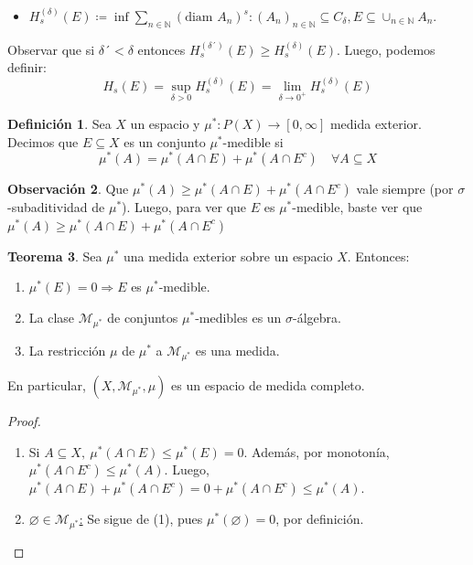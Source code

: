 \documentclass[11pt]{article}
\theoremstyle{definition} %
\newtheorem{theorem}{Teorema}[section]
\newtheorem{definition}[theorem]{Definición}
\newtheorem{remark}[theorem]{Observación}
\newcommand{\N}{\mathbb{N}}
\begin{document}
\begin{property}
\begin{itemize}
  \item $H_s^{(\delta)}(E)\coloneqq \inf{\sum_{n\in \N}(\text{diam }A_n)^s: (A_n)_{n\in \N} \subseteq C_{\delta}, E\subseteq \cup_{n\in \N}A_n}$.
\end{itemize}
Observar que si $\delta´< \delta $ entonces $H_s^{(\delta´)}(E) \geq H_s^{(\delta)}(E)$. Luego, podemos definir:
\[
  H_s(E) = \sup_{\delta > 0}H_s^{(\delta)}(E) = \lim_{\delta \to 0^+} H_s^{(\delta)}(E)
\]


\begin{definition}
  Sea $X$ un espacio y $\mu^*:P(X)\rightarrow [0,\infty]$ medida exterior. Decimos que $E\subseteq X$ es un conjunto $\mu^*$-medible si 
  \[
    \mu^*(A)= \mu^*(A\cap E)+ \mu^*(A\cap E^c) \quad \forall A\subseteq X
  \]
\end{definition}

\begin{remark}
  Que $\mu^*(A)\geq \mu^*(A\cap E)+ \mu^*(A\cap E^c) $ vale siempre (por $\sigma$-subaditividad de $\mu^*$). Luego, para ver que $E$ es $\mu^*$-medible, baste ver que $\mu^*(A)\geq \mu^*(A\cap E)+ \mu^*(A\cap E^c)$ 
\end{remark}

\begin{theorem}
  Sea $\mu^*$ una medida exterior sobre un espacio $X$. Entonces:
  \begin{enumerate}
    \item[(1)] $\mu^*(E)=0 \Rightarrow E$ es $\mu^*$-medible.

    \item[(2)] La clase $\mathscr{M}_{\mu^*}$ de conjuntos $\mu^*$-medibles es un $\sigma$-álgebra.

    \item[(3)] La restricción $\mu$ de $\mu^*$ a $\mathscr{M}_{\mu^*}$ es una medida.
  \end{enumerate}
  En particular, $(X, \mathscr{M}_{\mu^*}, \mu)$ es un espacio de medida completo. 
\end{theorem}

\begin{proof}~
	\begin{enumerate}
		\item Si $A \subseteq X,\ \mu^{*}(A \cap E) \leq \mu^{*}(E) = 0$. Además, por monotonía, $\mu^{*}(A \cap E^c) \leq \mu^{*}(A)$. Luego, $\mu^{*}(A \cap E) + \mu^{*}(A \cap E^c) = 0 + \mu^{*}(A \cap E^c) \leq \mu^{*}(A)$.

		\item \underline{$\varnothing \in \mathscr{M}_{\mu^{*}}$:} Se sigue de (1), pues $\mu^{*}(\varnothing) = 0$, por definición.


\end{enumerate}
\end{proof}
\end{property}
\end{document}
